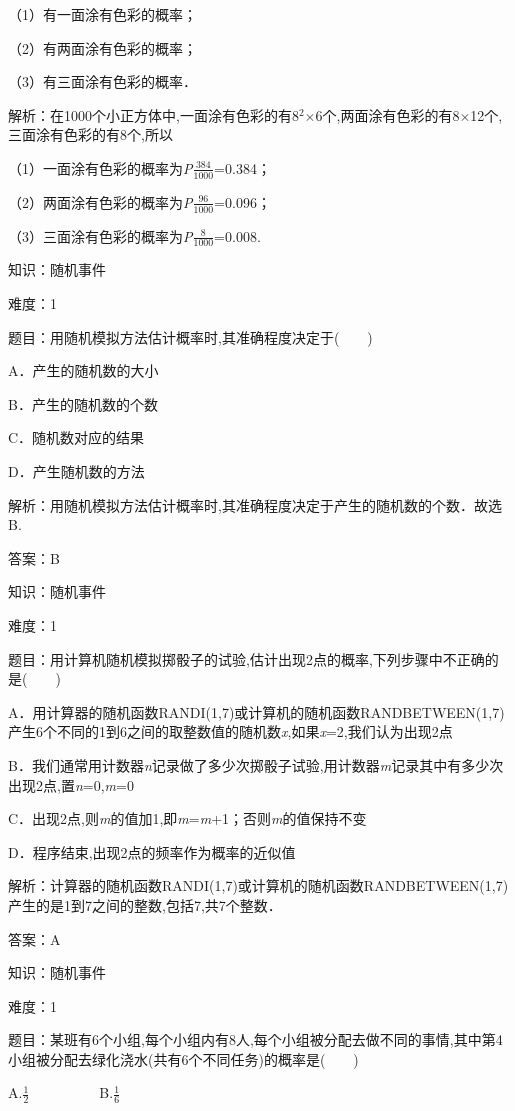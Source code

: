 \documentclass{article} %
\begin{document}
（1）有一面涂有色彩的概率；

（2）有两面涂有色彩的概率；

（3）有三面涂有色彩的概率．

解析：在1000个小正方体中,一面涂有色彩的有8${}^{2}$$\mathrm{\times}$6个,两面涂有色彩的有8$\mathrm{\times}$12个,三面涂有色彩的有8个,所以

（1）一面涂有色彩的概率为\textit{P}$\frac{384}{1000}$=0.384；

（2）两面涂有色彩的概率为\textit{P}$\frac{96}{1000}$=0.096；

（3）三面涂有色彩的概率为\textit{P}$\frac{8}{1000}$=0.008.

知识：随机事件

难度：1

题目：用随机模拟方法估计概率时,其准确程度决定于(　　)

A．产生的随机数的大小

B．产生的随机数的个数

C．随机数对应的结果

D．产生随机数的方法

解析：用随机模拟方法估计概率时,其准确程度决定于产生的随机数的个数．故选B.

答案：B

知识：随机事件

难度：1

题目：用计算机随机模拟掷骰子的试验,估计出现2点的概率,下列步骤中不正确的是(　　)

A．用计算器的随机函数RANDI(1,7)或计算机的随机函数RANDBETWEEN(1,7)产生6个不同的1到6之间的取整数值的随机数\textit{x},如果\textit{x}=2,我们认为出现2点

B．我们通常用计数器\textit{n}记录做了多少次掷骰子试验,用计数器\textit{m}记录其中有多少次出现2点,置\textit{n}=0,\textit{m}=0

C．出现2点,则\textit{m}的值加1,即\textit{m}=\textit{m}+1；否则\textit{m}的值保持不变

D．程序结束,出现2点的频率作为概率的近似值

解析：计算器的随机函数RANDI(1,7)或计算机的随机函数RANDBETWEEN(1,7)产生的是1到7之间的整数,包括7,共7个整数．

答案：A

知识：随机事件

难度：1

题目：某班有6个小组,每个小组内有8人,每个小组被分配去做不同的事情,其中第4小组被分配去绿化浇水(共有6个不同任务)的概率是(　　)

A.$\frac{1}{2}$　　　　　B.$\frac{1}{6}$
\end{document}
